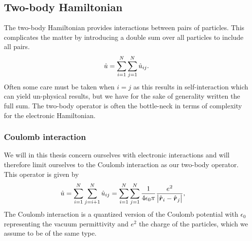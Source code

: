         \subsection{Two-body Hamiltonian}
            The two-body Hamiltonian provides interactions between pairs of
            particles.
            This complicates the matter by introducing a double sum over all
            particles to include all pairs.
            \begin{align}
                \hat{u}
                = \sum_{i = 1}^{N} \sum_{j = 1}^{N} \hat{u}_{ij}.
            \end{align}
            Often some care must be taken when $i = j$ as this results in
            self-interaction which can yield un-physical results, but we have
            for the sake of generality written the full sum.
            The two-body operator is often the bottle-neck in terms of
            complexity for the electronic Hamiltonian.

            \subsubsection{Coulomb interaction}
                We will in this thesis concern ourselves with electronic
                interactions and will therefore limit ourselves to the Coulomb
                interaction as our two-body operator.
                This operator is given by
                \begin{align}
                    \hat{u}
                    &= \sum_{i = 1}^{N}\sum_{j = i + 1}^{N}
                    \hat{u}_{ij}
                    = \sum_{i = 1}^{N}\sum_{j = 1}^{N}
                    \frac{1}{4\epsilon_0\pi}\frac{e^2}{\abs{\hat{\boldsymbol{r}}_i -
                    \hat{\boldsymbol{r}}_j}},
                \end{align}
                The Coulomb interaction is a quantized version of the Coulomb
                potential with $\epsilon_0$ representing the vacuum
                permittivity and $e^2$ the charge of the particles, which we
                assume to be of the same type.


